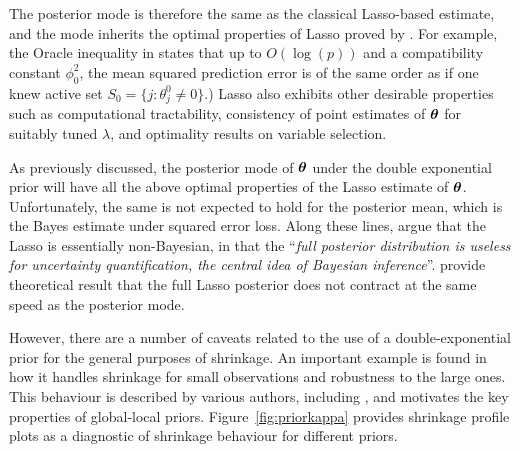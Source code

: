 \documentclass[11pt]{article}
\begin{document}
The posterior mode is therefore	the	 same as the classical Lasso-based
estimate, and the mode inherits the optimal properties of Lasso proved by
\cite{buhlmann2011statistics}. For example, the Oracle inequality in \citet[Eq.
(2.8), Th. (6.1)]{buhlmann2011statistics} states that up to $O(\log(p))$ and a
compatibility constant $\phi_0^2$, the mean squared prediction error is of the
same order as if one knew active set $S_0 = \{j : \theta_j^0 \neq 0 \}$.)
Lasso also exhibits other desirable properties such as computational
tractability, consistency of point estimates of $\boldsymbol{\theta}$ for suitably tuned
$\lambda$, and optimality results on variable selection. 

As previously discussed, the posterior mode of $\boldsymbol{\theta}$ under the double
exponential prior will have all the above optimal properties of the Lasso
estimate of $\boldsymbol{\theta}$. Unfortunately, the same is not expected to hold for the
posterior mean, which is the Bayes estimate under squared error loss. Along
these lines, \citet{castillo2015bayesian} argue that the Lasso is essentially
non-Bayesian, in that the ``\textsl{full posterior distribution is useless for
uncertainty quantification, the central idea of Bayesian inference}''.
\citet{castillo2015bayesian} provide theoretical result that the full Lasso
posterior does not contract at the same speed as the posterior mode. 

However, there are a number of caveats related to the use of a
double-exponential prior for the general purposes of shrinkage.  An important
example is found in how it handles shrinkage for small observations and
robustness to the large ones.  This behaviour is described by various authors,
including \cite{polson2010shrink,datta2013asymptotic}, and motivates the key
properties of global-local priors. Figure~\ref{fig:priorkappa} provides
shrinkage profile plots as a diagnostic of shrinkage behaviour for different
priors.
\end{document}
